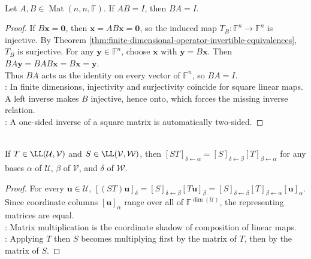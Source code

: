 \begin{theorem} \label{thm:square-one-sided-inverse-is-two-sided} \\
Let $A,B\in\operatorname{Mat}(n,n,\mathbb{F})$. If $AB=I$, then $BA=I$.
\begin{proof}
If $B\mathbf{x}=\mathbf{0}$, then $\mathbf{x}=AB\mathbf{x}=\mathbf{0}$, so the induced map $T_B:\mathbb{F}^n\to\mathbb{F}^n$ is injective. By Theorem \ref{thm:finite-dimensional-operator-invertible-equivalences}, $T_B$ is surjective. For any $\mathbf{y}\in\mathbb{F}^n$, choose $\mathbf{x}$ with $\mathbf{y}=B\mathbf{x}$. Then $BA\mathbf{y}=BAB\mathbf{x}=B\mathbf{x}=\mathbf{y}$.\\
Thus $BA$ acts as the identity on every vector of $\mathbb{F}^n$, so $BA=I$.\\
: In finite dimensions, injectivity and surjectivity coincide for square linear maps. A left inverse makes $B$ injective, hence onto, which forces the missing inverse relation.\\
: A one-sided inverse of a square matrix is automatically two-sided.
\end{proof}
\end{theorem}

\begin{proposition} \label{prop:composition-and-matrix-multiplication} \\
If $T \in \LL(\mathcal{U}, \mathcal{V})$ and $S \in \LL(\mathcal{V}, \mathcal{W})$, then $[ST]_{\delta \leftarrow \alpha} = [S]_{\delta \leftarrow \beta}[T]_{\beta \leftarrow \alpha}$ for any bases $\alpha$ of $\mathcal{U}$, $\beta$ of $\mathcal{V}$, and $\delta$ of $\mathcal{W}$.
\begin{proof}
For every $\mathbf{u}\in\mathcal{U}$, $[(ST)\mathbf{u}]_{\delta}=[S]_{\delta \leftarrow \beta}[T\mathbf{u}]_{\beta}=[S]_{\delta \leftarrow \beta}[T]_{\beta \leftarrow \alpha}[\mathbf{u}]_{\alpha}$.\\
Since coordinate columns $[\mathbf{u}]_{\alpha}$ range over all of $\mathbb{F}^{\dim(\mathcal{U})}$, the representing matrices are equal.\\
: Matrix multiplication is the coordinate shadow of composition of linear maps.\\
: Applying $T$ then $S$ becomes multiplying first by the matrix of $T$, then by the matrix of $S$.
\end{proof}
\end{proposition}

